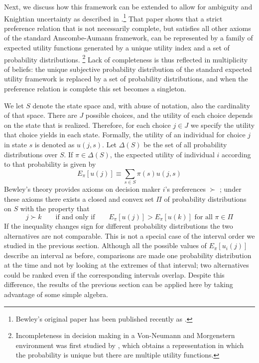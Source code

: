 \documentclass[reqno]{article}
\renewcommand{\cite}{\citet}
\begin{document}
Next, we discuss how this framework can be extended to allow for ambiguity
and Knightian uncertainty as described in \cite{Bewley86}.\footnote{%
Bewley's original paper has been published recently as \cite{Bewley02}.}
That paper shows that a strict preference relation that is not necessarily
complete, but satisfies all other axioms of the standard Anscombe-Aumann
framework, can be represented by a family of expected utility functions
generated by a unique utility index and a set of probability distributions.%
\footnote{%
Incompleteness in decision making in a Von-Neumann and Morgenstern
environment was first studied by \cite{Aumann62}, which obtains a
representation in which the probability is unique but there are multiple
utility functions.} Lack of completeness is thus reflected in multiplicity
of beliefs: the unique subjective probability distribution of the standard
expected utility framework is replaced by a set of probability
distributions, and when the preference relation is complete this set becomes
a singleton.

We let $S$ denote the state space and, with abuse of notation, also the
cardinality of that space. There are $J$ possible choices, and the utility
of each choice depends on the state that is realized. Therefore, for each
choice $j\in J$ we specify the utility that choice yields in each state.
Formally, the utility of an individual for choice $j$ in state $s$ is
denoted as $u\left( j,s\right) $. Let $\Delta (S)$ be the set of all
probability distributions over $S$. If $\pi \in \Delta (S)$, the expected
utility of individual $i$ according to that probability is given by 
\begin{equation*}
E_{\pi }\left[ u\left( j\right) \right] \equiv \sum_{s\in S}\pi \left(
s\right) u\left( j,s\right)
\end{equation*}%
Bewley's theory provides axioms on decision maker $i$'s preferences $\succ $%
; under these axioms there exists a closed and convex set $\Pi $ of
probability distributions on $S$ with the property that 
\begin{equation*}
j\succ k\qquad \text{if and only if}\qquad E_{\pi }\left[ u\left( j\right) %
\right] >E_{\pi }\left[ u\left( k\right) \right] \text{ for all }\pi \in \Pi
\end{equation*}%
If the inequality changes sign for different probability distributions the
two alternatives are not comparable. This is not a special case of the
interval order we studied in the previous section. Although all the possible
values of $E_{\pi }\left[ u_{i}\left( j\right) \right] $ describe an
interval as before, comparisons are made one probability distribution at the
time and not by looking at the extremes of that interval; two alternatives
could be ranked even if the corresponding intervals overlap. Despite this
difference, the results of the previous section can be applied here by
taking advantage of some simple algebra.
\end{document}
